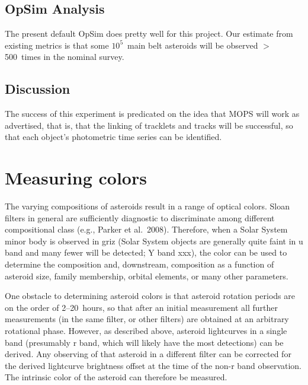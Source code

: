 
\subsection{OpSim Analysis}
\label{sec:\secname:analysis}

The present default OpSim does pretty well for this project.
Our estimate from existing metrics is that some $10^5$~main
belt asteroids will be observed $>$500~times in the 
nominal survey. 




\subsection{Discussion}
\label{sec:\secname:discussion}

The success of this experiment is predicated
on the idea that MOPS will work as advertised, 
that is, that the linking of tracklets and tracks
will be successful, so that each object's photometric
time series can be identified.

\navigationbar


\section{Measuring colors}
\def\secname{\chpname:colors}\label{sec:\secname}

The varying compositions of asteroids result
in a range of optical colors. Sloan filters
in general are sufficiently diagnostic to
discriminate among different compositional
class 
(e.g., Parker et al.\ 2008).
Therefore, when a Solar System
minor body is observed in griz (Solar System
objects are generally quite faint in u band
and many fewer will be detected; Y band xxx),
the color can be used to determine the composition
and, downstream, composition as a function of
asteroid size, family membership, orbital
elements, or many other parameters.

One obstacle to determining asteroid colors
is that asteroid rotation periods are
on the order of 2--20~hours, so that after
an initial measurement all further
measurements (in the same filter, or other
filters) are obtained at an arbitrary rotational
phase.
However, as described above, asteroid lightcurves
in a single band (presumably r band, which
will likely have the most detections) can be
derived. Any observing of that asteroid
in a different filter can be corrected
for the derived lightcurve brightness
offset at the time of the non-r band observation.
The intrinsic color of the asteroid can therefore
be measured.

